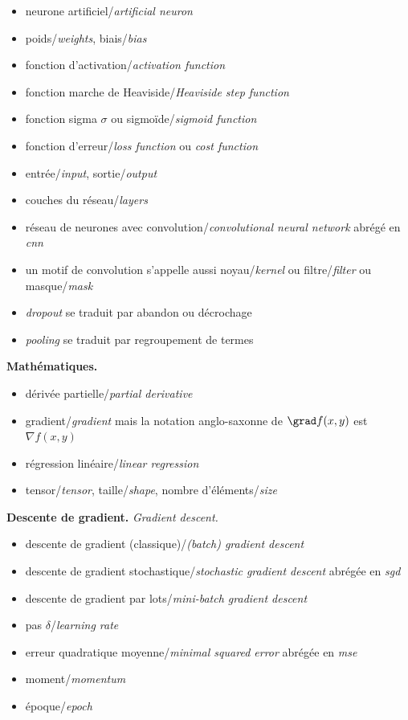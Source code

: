 \documentclass[11pt,class=report,crop=false]{standalone}
\begin{document}
\begin{itemize}
  \item neurone artificiel/\emph{artificial neuron}
  \item poids/\emph{weights}, biais/\emph{bias}
  \item fonction d'activation/\emph{activation function}
  \item fonction marche de Heaviside/\emph{Heaviside step function}
  \item fonction sigma $\sigma$ ou sigmoïde/\emph{sigmoid function}
  \item fonction d'erreur/\emph{loss function} ou \emph{cost function}
  \item entrée/\emph{input}, sortie/\emph{output}
  \item couches du réseau/\emph{layers}
  \item réseau de neurones avec convolution/\emph{convolutional neural network} abrégé en \emph{cnn}
  \item un motif de convolution s'appelle aussi noyau/\emph{kernel} ou filtre/\emph{filter}
 ou masque/\emph{mask}
  \item \emph{dropout} se traduit par abandon ou décrochage
  \item \emph{pooling} se traduit par regroupement de termes
\end{itemize} 
 
\medskip

\textbf{Mathématiques.}

\begin{itemize}
  \item dérivée partielle/\emph{partial derivative}
  \item gradient/\emph{gradient} mais la notation anglo-saxonne de $\grad f(x,y)$ est $\nabla f(x,y)$
  \item régression linéaire/\emph{linear regression}
  \item tensor/\emph{tensor}, taille/\emph{shape}, nombre d'éléments/\emph{size}
\end{itemize} 
 
 
\medskip
 
\textbf{Descente de gradient.} \emph{Gradient descent.}

\begin{itemize}
 \item descente de gradient (classique)/\emph{(batch) gradient descent}
 \item descente de gradient stochastique/\emph{stochastic gradient descent} abrégée en \emph{sgd}
 \item descente de gradient par lots/\emph{mini-batch gradient descent}
 \item pas $\delta$/\emph{learning rate}
 \item erreur quadratique moyenne/\emph{minimal squared error} abrégée en \emph{mse}
 \item moment/\emph{momentum}
 \item époque/\emph{epoch}
\end{itemize}  
\end{document}
